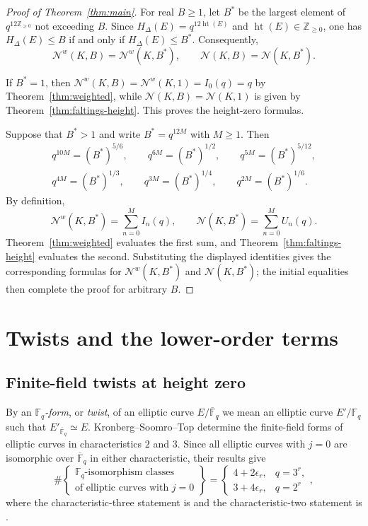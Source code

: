 \documentclass[a4paper,12pt]{amsart}
\theoremstyle{definition}
\newcommand{\Zb}{\mathbb{Z}}
\newcommand{\Fb}{\mathbb{F}}
\DeclareMathOperator{\height}{ht}
\newcommand{\Nc}{\mathcal{N}}
\begin{document}
\begin{proof}[Proof of Theorem~\ref{thm:main}]
For real $B\geq1$, let $B^\ast$ be the largest element of $q^{12\Zb_{\geq0}}$ not exceeding $B$.  Since $H_\Delta(E)=q^{12\height(E)}$ and $\height(E)\in\Zb_{\geq0}$, one has $H_\Delta(E)\leq B$ if and only if $H_\Delta(E)\leq B^\ast$.  Consequently,
\[
\Nc^w(K,B)=\Nc^w(K,B^\ast),
\qquad
\Nc(K,B)=\Nc(K,B^\ast).
\]

If $B^\ast=1$, then $\Nc^w(K,B)=\Nc^w(K,1)=I_0(q)=q$ by Theorem~\ref{thm:weighted}, while $\Nc(K,B)=\Nc(K,1)$ is given by Theorem~\ref{thm:faltings-height}.  This proves the height-zero formulas.

Suppose that $B^\ast>1$ and write $B^\ast=q^{12M}$ with $M\geq1$.  Then
\[
\begin{gathered}
q^{10M}=(B^\ast)^{5/6},
\qquad
q^{6M}=(B^\ast)^{1/2},
\qquad
q^{5M}=(B^\ast)^{5/12},\\
q^{4M}=(B^\ast)^{1/3},
\qquad
q^{3M}=(B^\ast)^{1/4},
\qquad
q^{2M}=(B^\ast)^{1/6}.
\end{gathered}
\]
By definition,
\[
\Nc^w(K,B^\ast)
=
\sum_{n=0}^M I_n(q),
\qquad
\Nc(K,B^\ast)
=
\sum_{n=0}^M U_n(q).
\]
Theorem~\ref{thm:weighted} evaluates the first sum, and Theorem~\ref{thm:faltings-height} evaluates the second.  Substituting the displayed identities gives the corresponding formulas for $\Nc^w(K,B^\ast)$ and $\Nc(K,B^\ast)$; the initial equalities then complete the proof for arbitrary $B$.
\end{proof}


\section{Twists and the lower-order terms}
\label{sec:twists}

\subsection{Finite-field twists at height zero}

By an \emph{$\Fb_q$-form}, or \emph{twist}, of an elliptic curve $E/\overline{\Fb}_q$ we mean an elliptic curve $E'/\Fb_q$ such that $E'_{\overline{\Fb}_q}\simeq E$.  Kronberg--Soomro--Top determine the finite-field forms of elliptic curves in characteristics $2$ and $3$.  Since all elliptic curves with $j=0$ are isomorphic over $\overline{\Fb}_q$ in either characteristic, their results give
\[
\#\left\{
\begin{array}{c}
\Fb_q\text{-isomorphism classes}\\
\text{of elliptic curves with }j=0
\end{array}
\right\}
=
\begin{cases}
4+2\epsilon_r,&q=3^r,\\
3+4\epsilon_r,&q=2^r
\end{cases},
\]
where the characteristic-three statement is \cite[Proposition~2.2]{KST} and the characteristic-two statement is \cite[Proposition~3.2]{KST}.
\end{document}
